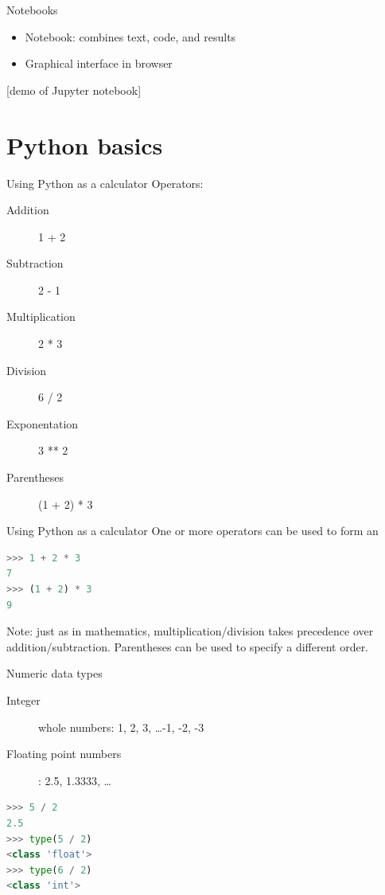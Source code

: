 \documentclass{beamer}
\begin{document}
\begin{frame}{Notebooks}
\begin{itemize}
    \item Notebook: combines text, code, and results
    \item Graphical interface in browser
\end{itemize}

[demo of Jupyter notebook]
\end{frame}


\section{Python basics}
\frame{\tableofcontents[currentsection]}

\begin{frame}[fragile]{Using Python as a calculator}
Operators:
    \begin{description}
        \item[Addition] 1 + 2
        \item[Subtraction] 2 - 1
        \item[Multiplication] 2 * 3
        \item[Division] 6 / 2
        \item[Exponentation] 3 ** 2
        \item[Parentheses] (1 + 2) * 3
    \end{description}
\end{frame}

\begin{frame}[fragile]{Using Python as a calculator}
One or more operators can be used to form an 
\begin{lstlisting}[language=python]
>>> 1 + 2 * 3
7
>>> (1 + 2) * 3
9
\end{lstlisting}

\pause
Note: just as in mathematics, multiplication/division takes precedence over
    addition/subtraction. Parentheses can be used to specify a different order.
\end{frame}

\begin{frame}[fragile]{Numeric data types}
    \begin{description}
        \item[Integer] whole numbers: 1, 2, 3, \dots -1, -2, -3
        \item[Floating point numbers]: 2.5, 1.3333, \dots
    \end{description}

\pause
\begin{lstlisting}[language=python]
>>> 5 / 2
2.5
>>> type(5 / 2)
<class 'float'>
>>> type(6 / 2)
<class 'int'>
\end{lstlisting}
\end{frame}
\end{document}
